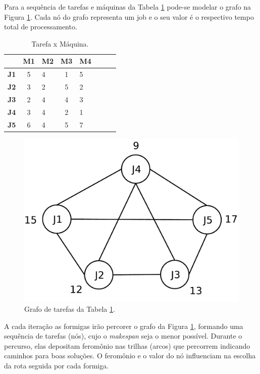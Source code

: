 Para a sequência de tarefas e máquinas da Tabela \ref{tabela:tarefamaquina} pode-se modelar o grafo na Figura \ref{fig:graph}. 
Cada nó do grafo representa um job e o seu valor é o respectivo tempo total de processamento.
  \begin{table}[htbp]
  \centering
    \small\begin{tabular}{ l c l c l c l c }
  	\hline 
  	 & \textbf{M1} & \textbf{M2} & \textbf{M3} & \textbf{M4}\\
	\hline 
	\textbf{J1} & 5 & 4 & 1 & 5\\
	\textbf{J2} & 3 & 2 & 5 & 2\\
	\textbf{J3} & 2 & 4 & 4 & 3\\
	\textbf{J4} & 3 & 4 & 2 & 1\\
	\textbf{J5} & 6 & 4 & 5 & 7\\
  	\hline 
  \end{tabular}
  \caption{Tarefa x Máquina.}
  \label{tabela:tarefamaquina}
  \end{table}

\begin{figure}[ht]
  \centering
  \includegraphics[scale=0.3]{./fig/graph.pdf}
  \caption{Grafo de tarefas da Tabela \ref{tabela:tarefamaquina}.}
  \label{fig:graph}
\end{figure}

A cada iteração as formigas irão percorer o grafo da Figura \ref{fig:graph}, formando uma sequência de tarefas (nós), cujo o 
\textit{makespan} seja o menor possível. Durante o percurso, elas depositam feromônio nas trilhas (arcos) que percorrem 
indicando caminhos para boas soluções. O feromônio e o valor do nó influenciam na escolha da rota seguida por
cada formiga.

